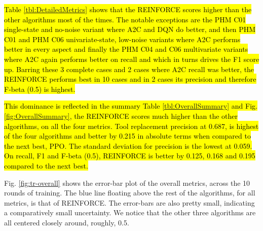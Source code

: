 \documentclass[a4paper, 12pt]{article}
\newcommand{\hlc}[2][cyan!10]{{\colorlet{foo}{#1} \sethlcolor{foo}\hl{#2}}}
\begin{document}
\hlc{Table {\ref{tbl:DetailedMetrics}} shows that the REINFORCE scores higher than the other algorithms most of the times. The notable exceptions are the PHM C01 single-state and no-noise variant where A2C and DQN do better, and then PHM C01 and PHM C06 univariate-state, low-noise variants where A2C performs better in every aspect and finally the PHM C04 and C06 multivariate variants where A2C again performs better on recall and which in turns drives the F1 score up. Barring these 3 complete cases and 2 cases where A2C recall was better, the REINFORCE performs best in 10 cases and in 2 cases its precision and therefore F-beta (0.5) is highest.}

\hlc{This dominance is reflected in the summary Table {\ref{tbl:OverallSummary}} and Fig. {\ref{fig:OverallSummary}}, the REINFORCE scores much higher than the other algorithms, on all the four metrics. Tool replacement precision at 0.687, is highest of the four algorithms and better by 0.215 in absolute terms when compared to the next best, PPO. The standard deviation for precision is the lowest at 0.059. On recall, F1 and F-beta (0.5), REINFORCE is better by 0.125, 0.168 and 0.195 compared to the next best.} 

Fig. \ref{fig:tr-overall} shows the error-bar plot of the overall metrics, across the 10 rounds of training. The blue line floating above the rest of the algorithms, for all metrics, is that of REINFORCE. The error-bars are also pretty small, indicating a comparatively small uncertainty. We notice that the other three algorithms are all centered closely around, roughly, 0.5.
\end{document}
